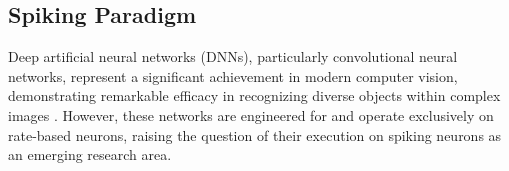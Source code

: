 \subsection[Spiking Paradigm]{Spiking Paradigm}


Deep artificial neural networks (DNNs), particularly convolutional neural networks, represent a significant achievement in modern computer vision, demonstrating remarkable efficacy in recognizing diverse objects within complex images \cite{krizhevsky2012imagenet}. However, these networks are engineered for and operate exclusively on rate-based neurons, raising the question of their execution on spiking neurons as an emerging research area.\\



